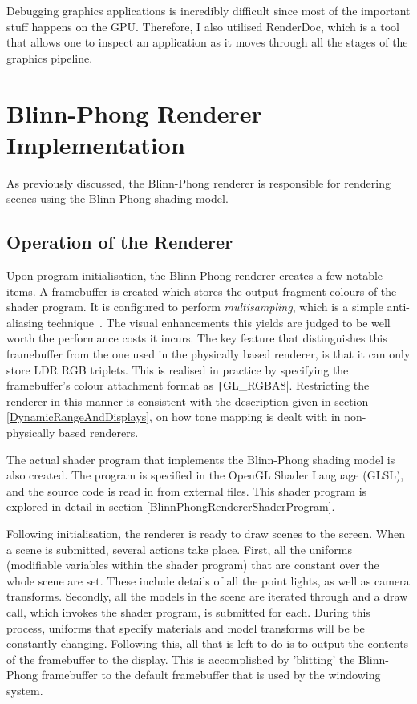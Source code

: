 Debugging graphics applications is incredibly difficult since most of the important stuff happens on the GPU. Therefore, I also utilised RenderDoc, which is a tool that allows one to inspect an application as it moves through all the stages of the graphics pipeline.

\section{Blinn-Phong Renderer Implementation} \label{BlinnPhongImplementation}

As previously discussed, the Blinn-Phong renderer is responsible for rendering scenes using the Blinn-Phong shading model.

\subsection{Operation of the Renderer}

Upon program initialisation, the Blinn-Phong renderer creates a few notable items. A framebuffer is created which stores the output fragment colours of the shader program. It is configured to perform \textit{multisampling}, which is a simple anti-aliasing technique~\cite{RealityEngine}. The visual enhancements this yields are judged to be well worth the performance costs it incurs. The key feature that distinguishes this framebuffer from the one used in the physically based renderer, is that it can only store LDR RGB triplets. This is realised in practice by specifying the framebuffer's colour attachment format as \texttt|GL_RGBA8|. Restricting the renderer in this manner is consistent with the description given in section \ref{DynamicRangeAndDisplays}, on how tone mapping is dealt with in non-physically based renderers.

The actual shader program that implements the Blinn-Phong shading model is also created. The program is specified in the OpenGL Shader Language (GLSL), and the source code is read in from external files. This shader program is explored in detail in section \ref{BlinnPhongRendererShaderProgram}.

Following initialisation, the renderer is ready to draw scenes to the screen. When a scene is submitted, several actions take place. First, all the uniforms (modifiable variables within the shader program) that are constant over the whole scene are set. These include details of all the point lights, as well as camera transforms. Secondly, all the models in the scene are iterated through and a draw call, which invokes the shader program, is submitted for each. During this process, uniforms that specify materials and model transforms will be be constantly changing. Following this, all that is left to do is to output the contents of the framebuffer to the display. This is accomplished by 'blitting' the Blinn-Phong framebuffer to the default framebuffer that is used by the windowing system.

